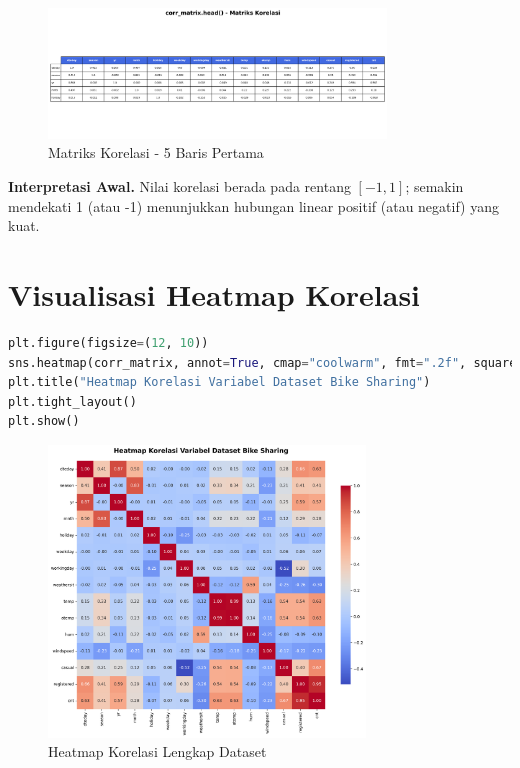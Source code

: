 \documentclass[11pt,a4paper]{article}
\begin{document}
\begin{figure}[h]
    \centering
    \includegraphics[width=0.8\textwidth]{./OUTPUT/step3_correlation_head.png}
    \caption{Matriks Korelasi - 5 Baris Pertama}
    \label{fig:correlation_head}
\end{figure}

\noindent\textbf{Interpretasi Awal.}
Nilai korelasi berada pada rentang $[-1,1]$; semakin mendekati 1 (atau -1) menunjukkan hubungan linear positif (atau negatif) yang kuat.

\section{Visualisasi Heatmap Korelasi}
\begin{lstlisting}[language=Python]
plt.figure(figsize=(12, 10))
sns.heatmap(corr_matrix, annot=True, cmap="coolwarm", fmt=".2f", square=True)
plt.title("Heatmap Korelasi Variabel Dataset Bike Sharing")
plt.tight_layout()
plt.show()
\end{lstlisting}

\begin{figure}[h]
    \centering
    \includegraphics[width=0.75\textwidth]{./OUTPUT/step4_heatmap_korelasi.png}
    \caption{Heatmap Korelasi Lengkap Dataset}
    \label{fig:heatmap_korelasi}
\end{figure}
\end{document}
